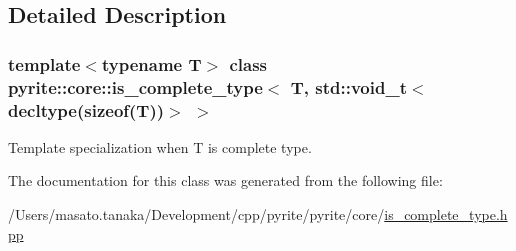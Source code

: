 \subsection{Detailed Description}
\subsubsection*{template$<$typename T$>$\newline
class pyrite\+::core\+::is\+\_\+complete\+\_\+type$<$ T, std\+::void\+\_\+t$<$ decltype(sizeof(\+T))$>$ $>$}

Template specialization when T is complete type. 

The documentation for this class was generated from the following file\+:\begin{DoxyCompactItemize}
\item 
/\+Users/masato.\+tanaka/\+Development/cpp/pyrite/pyrite/core/\mbox{\hyperlink{core_2is__complete__type_8hpp}{is\+\_\+complete\+\_\+type.\+hpp}}\end{DoxyCompactItemize}
